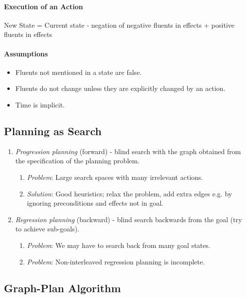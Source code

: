\documentclass[twocolumn,english]{article}
\begin{document}
\paragraph{Execution of an Action}

New State = Current state - negation of negative fluents in effects
+ positive fluents in effects

\paragraph{Assumptions}
\begin{itemize}
\item Fluents not mentioned in a state are false.
\item Fluents do not change unless they are explicitly changed by an action.
\item Time is implicit.
\end{itemize}

\subsection{Planning as Search}
\begin{enumerate}
\item \emph{Progression planning} (forward) - blind search with the graph
obtained from the specification of the planning problem.
\begin{enumerate}
\item \emph{Problem}: Large search spaces with many irrelevant actions.
\item \emph{Solution}: Good heuristics; relax the problem, add extra edges
e.g. by ignoring preconditions and effects not in goal.
\end{enumerate}
\item \emph{Regression planning} (backward) - blind search backwards from
the goal (try to achieve sub-goals).
\begin{enumerate}
\item \emph{Problem}: We may have to search back from many goal states.
\item \emph{Problem}: Non-interleaved regression planning is incomplete.
\end{enumerate}
\end{enumerate}

\subsection{Graph-Plan Algorithm}
\end{document}
